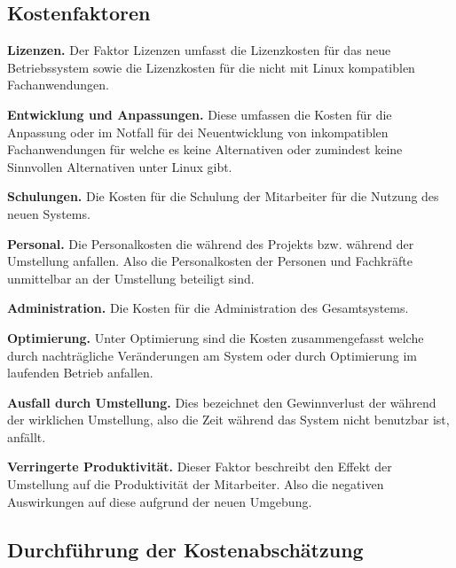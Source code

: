 \documentclass[12pt,utf8]{scrartcl}
\begin{document}
\subsection*{Kostenfaktoren}

\textbf{Lizenzen.} Der Faktor Lizenzen umfasst die Lizenzkosten für das neue Betriebssystem sowie die Lizenzkosten für die nicht mit Linux kompatiblen Fachanwendungen.
\newline

\textbf{Entwicklung und Anpassungen.} Diese umfassen die Kosten für die Anpassung oder im Notfall für dei Neuentwicklung von inkompatiblen Fachanwendungen für welche es keine Alternativen oder zumindest keine Sinnvollen Alternativen unter Linux gibt.
\newline

\textbf{Schulungen.} Die Kosten für die Schulung der Mitarbeiter für die Nutzung des neuen Systems.
\newline

\textbf{Personal.} Die Personalkosten die während des Projekts bzw. während der Umstellung anfallen. Also die Personalkosten der Personen und Fachkräfte unmittelbar an der Umstellung beteiligt sind.
\newline

\textbf{Administration.} Die Kosten für die Administration des Gesamtsystems.
\newline

\textbf{Optimierung.} Unter Optimierung sind die Kosten zusammengefasst welche durch nachträgliche Veränderungen am System oder durch Optimierung im laufenden Betrieb anfallen.
\newline

\textbf{Ausfall durch Umstellung.} Dies bezeichnet den Gewinnverlust der während der wirklichen Umstellung, also die Zeit während das System nicht benutzbar ist, anfällt.
\newline

\textbf{Verringerte Produktivität.} Dieser Faktor beschreibt den Effekt der Umstellung auf die Produktivität der Mitarbeiter. Also die negativen Auswirkungen auf diese aufgrund der neuen Umgebung.
\newpage

\subsection*{Durchführung der Kostenabschätzung}
\end{document}
